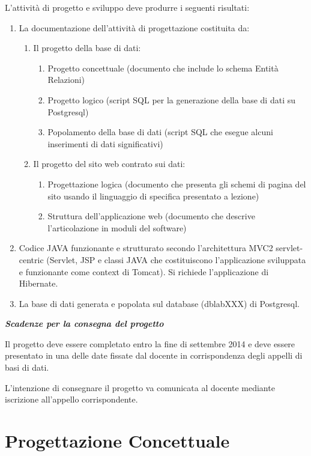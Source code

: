 \documentclass[a4paper,titlepage]{article}
\begin{document}
\noindent
L'attività di progetto e sviluppo deve produrre i seguenti risultati:\par
\begin{enumerate}
\item La documentazione dell'attività di progettazione costituita da:
\begin{enumerate}
\item Il progetto della base di dati:
\begin{enumerate}
\item Progetto concettuale (documento che include lo schema Entità Relazioni)
\item Progetto logico (script SQL per la generazione della base di dati su Postgresql)
\item Popolamento della base di dati (script SQL che esegue alcuni inserimenti di dati significativi)
\end{enumerate}
\item Il progetto del sito web contrato sui dati:
\begin{enumerate}
\item Progettazione logica (documento che presenta gli schemi di pagina del sito usando il linguaggio di specifica presentato a lezione)
\item Struttura dell'applicazione web (documento che descrive l'articolazione in moduli del software)
\end{enumerate}
\end{enumerate}
\item Codice JAVA funzionante e strutturato secondo l'architettura MVC2 servlet-centric (Servlet, JSP e classi JAVA che costituiscono l'applicazione sviluppata e funzionante come context di Tomcat). Si richiede l'applicazione di Hibernate.
\item La base di dati generata e popolata sul database (dblabXXX) di Postgresql.
\end{enumerate}

\noindent
\emph{\textbf{\Large{Scadenze per la consegna del progetto}}}

\noindent
Il progetto deve essere completato entro la fine di settembre 2014 e deve essere presentato in una delle date fissate dal docente in corrispondenza degli appelli di basi di dati.\par
\noindent
L'intenzione di consegnare il progetto va comunicata al docente mediante iscrizione all'appello corrispondente.

\newpage
\part{Progettazione Concettuale}
\end{document}
